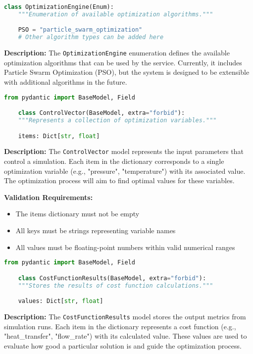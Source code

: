 \begin{lstlisting}[language=Python, caption={OptimizationEngine enumeration definition}]
	class OptimizationEngine(Enum):
	"""Enumeration of available optimization algorithms."""

	PSO = "particle_swarm_optimization"
	# Other algorithm types can be added here
\end{lstlisting}

\textbf{Description:}
The \texttt{OptimizationEngine} enumeration defines the available optimization algorithms that can be used by the service. Currently, it includes Particle Swarm Optimization (PSO), but the system is designed to be extensible with additional algorithms in the future.

\begin{lstlisting}[language=Python, caption={ControlVector model definition}]
	from pydantic import BaseModel, Field

	class ControlVector(BaseModel, extra="forbid"):
	"""Represents a collection of optimization variables."""

	items: Dict[str, float]
\end{lstlisting}

\textbf{Description:}
The \texttt{ControlVector} model represents the input parameters that control a simulation. Each item in the dictionary corresponds to a single optimization variable (e.g., "pressure", "temperature") with its associated value. The optimization process will aim to find optimal values for these variables.

\textbf{Validation Requirements:}
\begin{itemize}
	\item The items dictionary must not be empty
	\item All keys must be strings representing variable names
	\item All values must be floating-point numbers within valid numerical ranges
\end{itemize}

\begin{lstlisting}[language=Python, caption={CostFunctionResults model definition}]
	from pydantic import BaseModel, Field

	class CostFunctionResults(BaseModel, extra="forbid"):
	"""Stores the results of cost function calculations."""

	values: Dict[str, float]
\end{lstlisting}

\textbf{Description:}
The \texttt{CostFunctionResults} model stores the output metrics from simulation runs. Each item in the dictionary represents a cost function (e.g., "heat\_transfer", "flow\_rate") with its calculated value. These values are used to evaluate how good a particular solution is and guide the optimization process.

